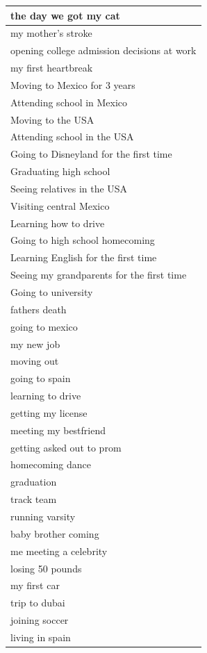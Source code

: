 \documentclass[
  .7em,
  letterpaper,
  DIV=11,
  numbers=noendperiod]{scrartcl}
\begin{document}
\begin{table}
\begin{tabular}{l}
\hline
the day we got my cat\\
\hline
my mother's stroke\\
\hline
opening college admission decisions at work\\
\hline
my first heartbreak\\
\hline
Moving to Mexico for 3 years\\
\hline
Attending school in Mexico\\
\hline
Moving to the USA\\
\hline
Attending school in the USA\\
\hline
Going to Disneyland for the first time\\
\hline
Graduating high school\\
\hline
Seeing relatives in the USA\\
\hline
Visiting central Mexico\\
\hline
Learning how to drive\\
\hline
Going to high school homecoming\\
\hline
Learning English for the first time\\
\hline
Seeing my grandparents for the first time\\
\hline
Going to university\\
\hline
fathers death\\
\hline
going to mexico\\
\hline
my new job\\
\hline
moving out\\
\hline
going to spain\\
\hline
learning to drive\\
\hline
getting my license\\
\hline
meeting my bestfriend\\
\hline
getting asked out to prom\\
\hline
homecoming dance\\
\hline
graduation\\
\hline
track team\\
\hline
running varsity\\
\hline
baby brother coming\\
\hline
me meeting a celebrity\\
\hline
losing 50 pounds\\
\hline
my first car\\
\hline
trip to dubai\\
\hline
joining soccer\\
\hline
living in spain\\

\end{tabular}
\end{table}
\end{document}
